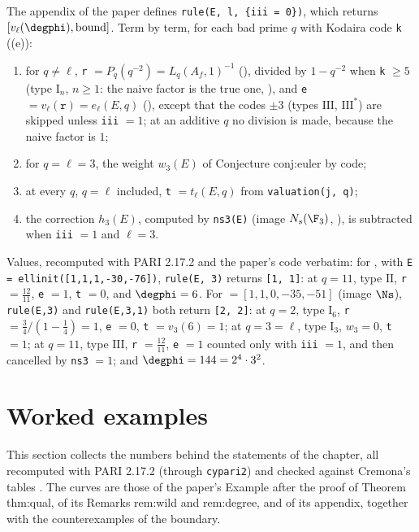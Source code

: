 \begin{example}\label{ex:lfunctions:rule}
The appendix of the paper defines \texttt{rule(E, l, \{iii = 0\})}, which returns $[v_\ell(\degphi),\text{bound}]$. Term by term, for each bad prime $q$ with Kodaira code \texttt{k}
((e)):
\begin{enumerate}[label=(\alph*)]
\item for $q\ne\ell$, \texttt{r} $=P_q(q^{-2})=L_q(A_f,1)^{-1}$ (), divided by $1-q^{-2}$ when \texttt{k} $\ge5$ (type $\mathrm I_n$, $n\ge1$: the naive factor is the true one,
), and \texttt{e} $=v_\ell(\texttt r)=e_\ell(E,q)$ (), except that the codes $\pm3$ (types $\mathrm{III}$, $\mathrm{III}^*$) are
skipped unless \texttt{iii} $=1$; at an additive $q$ no division is made, because the naive factor is $1$;
\item for $q=\ell=3$, the weight $w_3(E)$ of Conjecture conj:euler by code;
\item at every $q$, $q=\ell$ included, \texttt{t} $=t_\ell(E,q)$ from \texttt{valuation(j, q)};
\item the correction $h_3(E)$, computed by \texttt{ns3(E)} (image $N_s(\F_3)$, ), is subtracted when \texttt{iii} $=1$ and $\ell=3$.
\end{enumerate}
Values, recomputed with PARI 2.17.2 and the paper's code verbatim: for , with \texttt{E = ellinit([1,1,1,-30,-76])}, \texttt{rule(E,~3)} returns \texttt{[1,~1]}: at $q=11$, type $\mathrm{II}$,
\texttt{r} $=\frac{12}{11}$, \texttt{e} $=1$, \texttt{t} $=0$, and $\degphi=6$. For  $=[1,1,0,-35,-51]$ (image $\Ns$), \texttt{rule(E,3)} and \texttt{rule(E,3,1)} both return
\texttt{[2, 2]}: at $q=2$, type $\mathrm I_6$, \texttt{r} $=\frac34/(1-\frac14)=1$, \texttt{e} $=0$, \texttt{t} $=v_3(6)=1$; at $q=3=\ell$, type $\mathrm I_3$, $w_3=0$, \texttt{t} $=1$; at $q=11$, type
$\mathrm{III}$, \texttt{r} $=\frac{12}{11}$, \texttt{e} $=1$ counted only with \texttt{iii} $=1$, and then cancelled by \texttt{ns3} $=1$; and $\degphi=144=2^4\cdot3^2$.
\end{example}

\section{Worked examples}\label{sec:lfunctions:examples}

This section collects the numbers behind the statements of the chapter, all recomputed with PARI 2.17.2 (through \texttt{cypari2}) and checked against Cremona's
tables \cite{ecdata}. The curves are those of the paper's Example after the proof of Theorem thm:qual, of its Remarks rem:wild and rem:degree, and of its appendix,
together with the counterexamples of the boundary.

